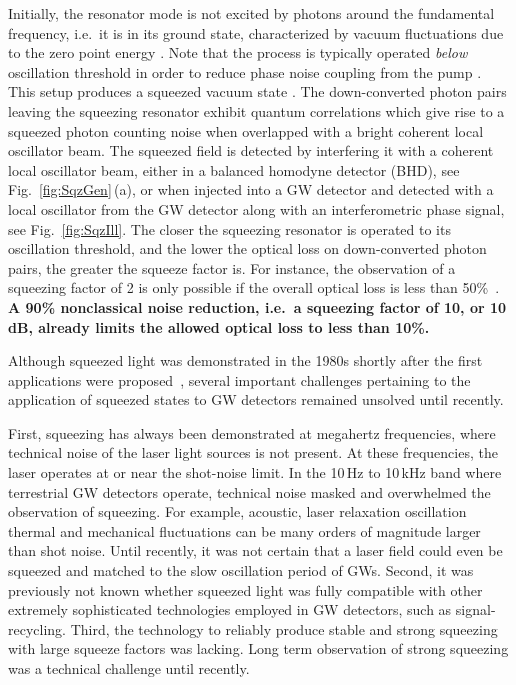 Initially, the resonator mode is not excited by photons
around the fundamental frequency, i.e.\ it is in its ground state,
characterized by vacuum fluctuations due to the zero point energy
\cite{GerryKnight}. Note that the process is typically operated
\textit{below} oscillation threshold in order to reduce phase noise coupling
from the pump \cite{Reid1989}.  This setup produces a squeezed vacuum
state \cite{GerryKnight}. The down-converted photon pairs leaving the squeezing
resonator exhibit quantum correlations which give rise to a squeezed
photon counting noise when overlapped with a bright coherent local
oscillator beam. The squeezed field is detected by interfering it
with a coherent local oscillator beam, either in a balanced homodyne
detector (BHD), see Fig.~\ref{fig:SqzGen}\,(a), or when injected into a GW
detector and detected with a local oscillator from the GW detector
along with an interferometric phase signal, see Fig.~\ref{fig:SqzIll}. The closer
the squeezing resonator is operated to its oscillation threshold,
and the lower the optical loss on down-converted photon pairs, the
greater the squeeze factor is. For instance, the observation of a
squeezing factor of 2
is only possible if the
overall optical loss is less than 50\%~\cite{BachorRalph2004}. \textbf{A
90\% nonclassical noise reduction, i.e.\ a squeezing factor of 10, or
10\,dB, already limits the allowed optical loss to less
than 10\%.}

Although squeezed light was demonstrated in the 1980s
shortly after the first applications were
proposed~\cite{Slusher1985,Shelby1986,Wu1986}, several important challenges pertaining to the application of
squeezed states to GW detectors remained unsolved until recently.

First, squeezing has always been demonstrated at megahertz
frequencies, where technical noise of the laser light sources is not present.  At these frequencies, the laser operates at or near the shot-noise limit.  In the 10\,Hz to
10\,kHz band where terrestrial GW detectors operate,
technical noise masked and overwhelmed the observation of squeezing.  For example, acoustic, laser relaxation oscillation thermal and mechanical fluctuations can be many orders of magnitude larger than shot noise.
Until recently, it was not certain that a laser field could even be squeezed and matched to the
slow oscillation period of GWs.
Second, it was previously not known whether squeezed light was fully
compatible with other extremely sophisticated technologies employed
in GW detectors, such as signal-recycling.
Third, the technology to reliably produce stable and strong
squeezing with large squeeze factors was lacking.  Long term observation of strong squeezing was a technical challenge until recently.

